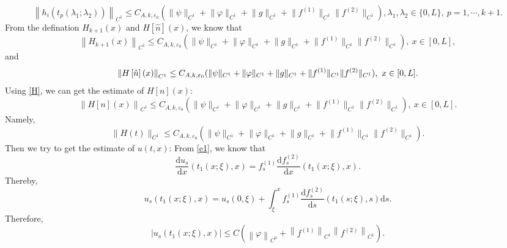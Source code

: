 \documentclass[a4paper,reqno,11pt]{amsart}
\numberwithin{equation}{section} %
\begin{document}
\begin{equation}\label{estimate of h_i at t_p}
	\left\| h_i(t_p(\lambda _1;\lambda _2)) \right\|_{C^1} \leq C_{A,k,\varepsilon _0}(\lVert \psi \rVert _{C^1}+\lVert \varphi  \rVert _{C^1}+  \lVert g \rVert _{C^1}+\lVert f^{(1)} \rVert _{C^1}\lVert f^{(2)} \rVert _{C^1}) ,\lambda _1,\lambda _2 \in \{ 0,L \} ,\ p=1,\cdots,k+1.
\end{equation}
From the defination $H_{k+1}(x)$ and $H\left[ \hat{n} \right] \left( x \right)$, we know that
\begin{equation}\label{estimate of H}
	\left\| H_{k+1}(x) \right\|_{C^1} \leq C_{A,k,\varepsilon _0}(\lVert \psi \rVert _{C^1}+\lVert \varphi  \rVert _{C^1}+  \lVert g \rVert _{C^1}+\lVert f^{(1)} \rVert _{C^1}\lVert f^{(2)} \rVert _{C^1}) ,\ x\in [0,L],
\end{equation}
and
\begin{equation}\label{estimate of hat{H}}
	\left\| H\left[ \hat{n} \right] \left( x \right) \right\|_{C^1} \leq C_{A,k,\varepsilon _0}(\lVert \psi \rVert _{C^1}+\lVert \varphi  \rVert _{C^1}+  \lVert g \rVert _{C^1}+\lVert f^{(1)} \rVert _{C^1}\lVert f^{(2)} \rVert _{C^1}) ,\ x\in [0,L].
\end{equation}
Using \eqref{H}, we can get the estimate of $H\left[ n \right] \left( x \right)$:
\begin{equation}\label{estimate of H[n]}
	\left\| H\left[ n \right] \left( x \right) \right\|_{C^1} \leq C_{A,k,\varepsilon _0}(\lVert \psi \rVert _{C^1}+\lVert \varphi  \rVert _{C^1}+  \lVert g \rVert _{C^1}+\lVert f^{(1)} \rVert _{C^1}\lVert f^{(2)} \rVert _{C^1}) ,\ x\in [0,L].
\end{equation}
Namely, 
\begin{equation}\label{estimate of h}	
\lVert H(t) \rVert _{C^1}  \leq C_{A,k,\varepsilon _0}(\lVert \psi \rVert _{C^1}+\lVert \varphi  \rVert _{C^1}+  \lVert g \rVert _{C^1}+\lVert f^{(1)} \rVert _{C^1}\lVert f^{(2)} \rVert _{C^1}).
\end{equation}
Then we try to get the estimate of $u(t,x)$:
From \eqref{e1}, we know that
$$
\frac{\mathrm{d}u_s}{\mathrm{d}x}\left( t_1(x;\xi ),x \right) =f_{s}^{(1)}\frac{\mathrm{d}f_{s}^{(2)}}{\mathrm{d}x}\left( t_1(x;\xi ),x \right) .
$$
Thereby,
$$
u_s\left( t_1\left( x;\xi \right) ,x \right) =u_s(0,\xi )+\int_{\xi}^x{f_{s}^{(1)}\frac{\mathrm{d}f_{s}^{(2)}}{\mathrm{d}s}\left( t_1\left( s;\xi \right) ,s \right) \mathrm{d}s}.
$$
Therefore,
$$
\left| u_s\left( t_1(x;\xi ),x \right) \right|\leq C\left( \left\| \varphi \right\| _{C^0}+\left\| f^{(1)} \right\| _{C^1}\left\| f^{(2)} \right\| _{C^1} \right) .
$$
\end{document}

